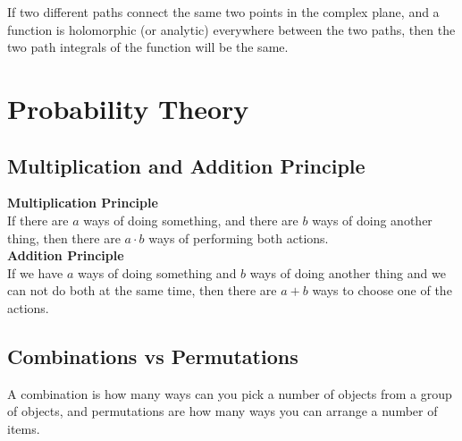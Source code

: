 \documentclass{article}
\numberwithin{theorem}{subsection}
\numberwithin{theorem}{subsubsection}
\numberwithin{lemma}{subsection}
\numberwithin{lemma}{subsubsection}
\theoremstyle{definition}
\numberwithin{definition}{subsection}
\numberwithin{definition}{subsubsection}
\begin{document}
If two different paths connect the same two points in the complex plane, and a function is holomorphic (or analytic) everywhere between the two paths, then the two path integrals of the function will be the same.


\begin{comment}
======================================================================================================================================================================================================================================================================================PROBABILITY THEORY================================================ ====================================================================================================================================================================================================================================
\end{comment}

\newpage

\section{Probability Theory}

\subsection{Multiplication and Addition Principle}
\noindent \textbf{Multiplication Principle} \\
\indent If there are $a$ ways of doing something, and there are $b$ ways of doing another thing, then there are $a\cdot b$ ways of performing both actions. \\

\noindent \textbf{Addition Principle} \\
\indent If we have $a$ ways of doing something and $b$ ways of doing another thing and we can not do both at the same time, then there are $a + b$ ways to choose one of the actions.

\subsection{Combinations vs Permutations}
A combination is how many ways can you pick a number of objects from a group of objects, and permutations are how many ways you can arrange a number of items.
\end{document}
